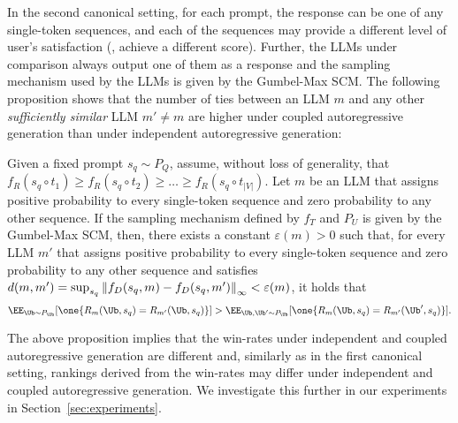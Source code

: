 In the second canonical setting, for each prompt, the response can be one of any single-token sequences, and each of the sequences may provide a different level of user'{}s satisfaction (\ie, achieve a different score). 
%
Further, the LLMs under comparison always output one of them as a response and the sampling mechanism used by the LLMs is given by the Gumbel-Max SCM.
%
The following proposition shows that the number of ties between an LLM $m$ and any other \emph{sufficiently similar} LLM $m' \neq m$ are higher under coupled autoregressive generation than under independent autoregressive generation:
%
\begin{proposition}\label{prop:gumbel_ties}
    Given a fixed prompt $s_q \sim P_{Q}$, 
    assume, without loss of generality, that $f_R(s_q \circ t_1) \geq f_R(s_q \circ t_2) \geq \ldots \geq f_R(s_q \circ t_{|V|})$. 
    Let $m$ be an LLM that assigns positive probability to every single-token sequence and zero probability to any other sequence. 
    If the sampling mechanism defined by $f_T$ and $P_U$ is given by the Gumbel-Max SCM, then, there exists a constant $\varepsilon(m)>0$ such that, for every LLM $m'$ that assigns positive probability to every single-token sequence and zero probability to any other sequence and satisfies $d(m,m')=\sup_{s_q} \left\lVert f_D(s_q,m)-f_D(s_q, m')\right\rVert_\infty < \varepsilon(m)$, it holds that
    \begin{equation*}
    \EE_{\Ub \sim P_{\Ub}}[\one\{R_m(\Ub, s_q)=R_{m'}(\Ub, s_q)\}] > \EE_{\Ub, \Ub' \sim P_{\Ub}}[\one\{R_m(\Ub, s_q)=R_{m'}(\Ub', s_q)\}].
    \end{equation*}
\end{proposition}
%
The above proposition implies that the win-rates under independent and coupled autoregressive generation are different and, similarly as in the first canonical setting, rankings derived from the win-rates may differ under independent and coupled autoregressive generation. We investigate this further in our experiments in Section~\ref{sec:experiments}.